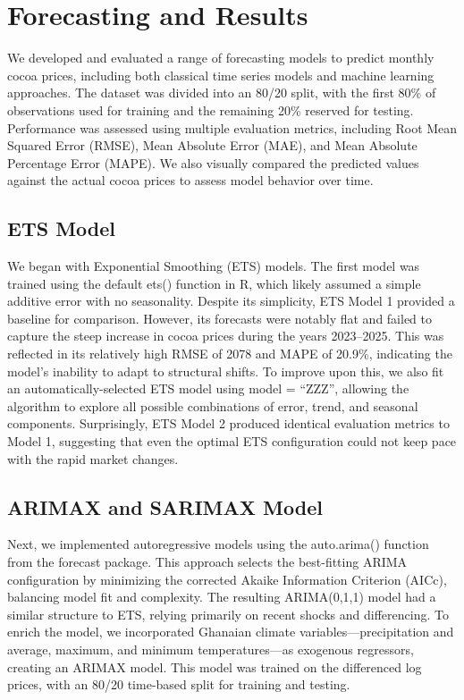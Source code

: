 \documentclass[
  letterpaper,
  DIV=11,
  numbers=noendperiod]{scrartcl}
\begin{document}
\hypertarget{forecasting-and-results}{%
\section{Forecasting and Results}\label{forecasting-and-results}}

We developed and evaluated a range of forecasting models to predict
monthly cocoa prices, including both classical time series models and
machine learning approaches. The dataset was divided into an 80/20
split, with the first 80\% of observations used for training and the
remaining 20\% reserved for testing. Performance was assessed using
multiple evaluation metrics, including Root Mean Squared Error (RMSE),
Mean Absolute Error (MAE), and Mean Absolute Percentage Error (MAPE). We
also visually compared the predicted values against the actual cocoa
prices to assess model behavior over time.

\hypertarget{ets-model}{%
\subsection{ETS Model}\label{ets-model}}

We began with Exponential Smoothing (ETS) models. The first model was
trained using the default ets() function in R, which likely assumed a
simple additive error with no seasonality. Despite its simplicity, ETS
Model 1 provided a baseline for comparison. However, its forecasts were
notably flat and failed to capture the steep increase in cocoa prices
during the years 2023--2025. This was reflected in its relatively high
RMSE of 2078 and MAPE of 20.9\%, indicating the model's inability to
adapt to structural shifts. To improve upon this, we also fit an
automatically-selected ETS model using model = ``ZZZ'', allowing the
algorithm to explore all possible combinations of error, trend, and
seasonal components. Surprisingly, ETS Model 2 produced identical
evaluation metrics to Model 1, suggesting that even the optimal ETS
configuration could not keep pace with the rapid market changes.

\hypertarget{arimax-and-sarimax-model}{%
\subsection{ARIMAX and SARIMAX Model}\label{arimax-and-sarimax-model}}

Next, we implemented autoregressive models using the auto.arima()
function from the forecast package. This approach selects the
best-fitting ARIMA configuration by minimizing the corrected Akaike
Information Criterion (AICc), balancing model fit and complexity. The
resulting ARIMA(0,1,1) model had a similar structure to ETS, relying
primarily on recent shocks and differencing. To enrich the model, we
incorporated Ghanaian climate variables---precipitation and average,
maximum, and minimum temperatures---as exogenous regressors, creating an
ARIMAX model. This model was trained on the differenced log prices, with
an 80/20 time-based split for training and testing.
\end{document}
